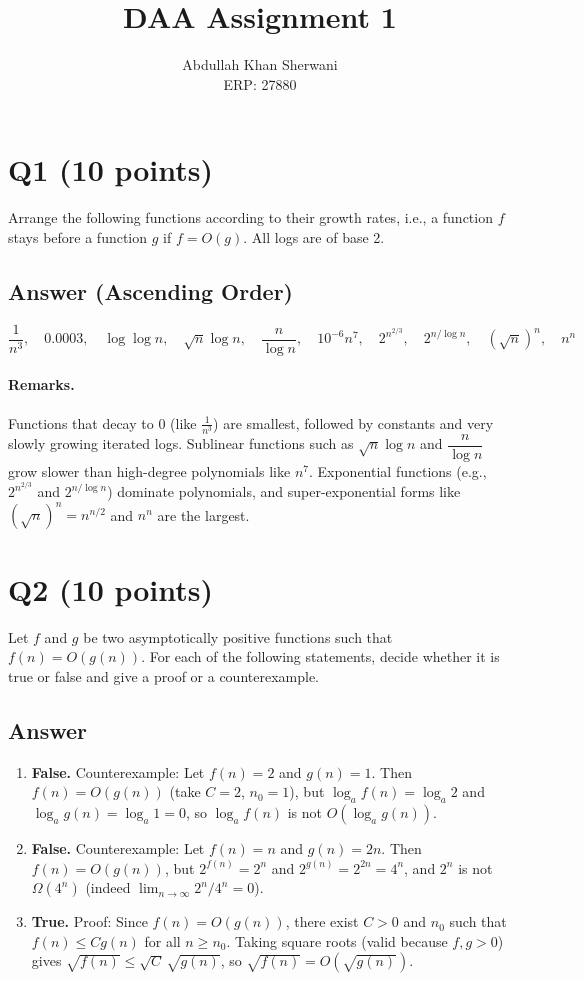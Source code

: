\documentclass[12pt]{article}
\title{DAA Assignment 1}
\author{Abdullah Khan Sherwani\\ERP: 27880}
\date{}
\begin{document}
\maketitle

\section*{Q1 (10 points)}
Arrange the following functions according to their growth rates, i.e., a function $f$ stays before a function $g$ if $f = O(g)$. All logs are of base 2.

\subsection*{Answer (Ascending Order)}
\[
\frac{1}{n^3},\quad 0.0003,\quad \log\log n,\quad \sqrt{n}\log n,\quad \frac{n}{\log n},\quad 10^{-6}n^7,\quad 2^{n^{2/3}},\quad 2^{n/\log n},\quad (\sqrt{n})^n,\quad n^n
\]

\paragraph{Remarks.} Functions that decay to $0$ (like $\frac{1}{n^3}$) are smallest, followed by constants and very slowly growing iterated logs. Sublinear functions such as $\sqrt{n}\log n$ and $\dfrac{n}{\log n}$ grow slower than high-degree polynomials like $n^7$. Exponential functions (e.g., $2^{n^{2/3}}$ and $2^{n/\log n}$) dominate polynomials, and super-exponential forms like $(\sqrt{n})^n = n^{n/2}$ and $n^n$ are the largest.

\section*{Q2 (10 points)}
Let $f$ and $g$ be two asymptotically positive functions such that $f(n) = O(g(n))$. For each of the following statements, decide whether it is true or false and give a proof or a counterexample.

\subsection*{Answer}
\begin{enumerate}
  \item[(a)] \textbf{False.} Counterexample: Let $f(n)=2$ and $g(n)=1$. Then $f(n)=O(g(n))$ (take $C=2$, $n_0=1$), but $\log_a f(n)=\log_a 2$ and $\log_a g(n)=\log_a 1=0$, so $\log_a f(n)$ is not $O(\log_a g(n))$.
  \item[(b)] \textbf{False.} Counterexample: Let $f(n)=n$ and $g(n)=2n$. Then $f(n)=O(g(n))$, but $2^{f(n)}=2^n$ and $2^{g(n)}=2^{2n}=4^n$, and $2^n$ is not $\Omega(4^n)$ (indeed $\lim_{n\to\infty}2^n/4^n=0$).
  \item[(c)] \textbf{True.} Proof: Since $f(n)=O(g(n))$, there exist $C>0$ and $n_0$ such that $f(n)\le C g(n)$ for all $n\ge n_0$. Taking square roots (valid because $f,g>0$) gives $\sqrt{f(n)}\le\sqrt{C}\,\sqrt{g(n)}$, so $\sqrt{f(n)}=O(\sqrt{g(n)})$.
\end{enumerate}
\end{document}
